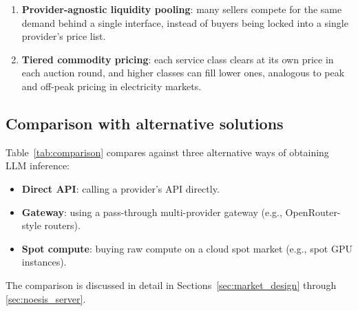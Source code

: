 \begin{enumerate}
  \item \textbf{Provider-agnostic liquidity pooling}: many sellers compete
    for the same demand behind a single interface, instead of buyers being
    locked into a single provider's price list.

  \item \textbf{Tiered commodity pricing}: each service class
    clears at its own price in each auction round, and higher classes can
    fill lower ones, analogous to peak and off-peak
    pricing in electricity markets.
\end{enumerate}

\subsection{Comparison with alternative solutions}
\label{sec:comparison_table}

Table~\ref{tab:comparison} compares \Noesis{} against three alternative ways
of obtaining LLM inference:

\begin{itemize}
  \item \textbf{Direct API}: calling a provider's API directly.
  \item \textbf{Gateway}: using a pass-through multi-provider gateway (e.g.,
    OpenRouter-style routers).
  \item \textbf{Spot compute}: buying raw compute on a cloud spot market
    (e.g., spot GPU instances).
\end{itemize}

The comparison is discussed in detail in Sections~\ref{sec:market_design}
through \ref{sec:noesis_server}.

